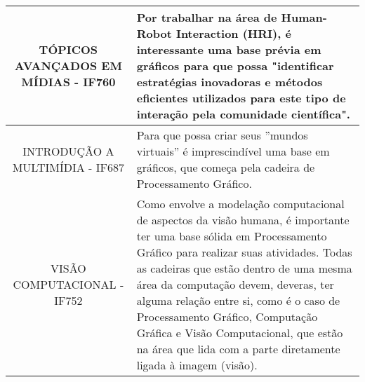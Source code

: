 \documentclass[a4paper]{article}
\begin{document}
\begin{table}[H]
\begin{tabular}{@{}|l p{7cm}|@{}}
\multicolumn{1}{|c|}{TÓPICOS AVANÇADOS EM MÍDIAS - IF760}                                      & Por trabalhar na área de Human-Robot Interaction (HRI), é interessante uma base prévia em gráficos para que possa "identificar estratégias inovadoras e métodos eficientes utilizados para este tipo de interação pela comunidade científica".                                                                                                                 \\ \midrule
\multicolumn{1}{|c|}{INTRODUÇÃO A MULTIMÍDIA - IF687}                                          & Para que possa criar seus ''mundos virtuais'' é imprescindível uma base em gráficos, que começa pela cadeira de Processamento Gráfico.                                                                                                                                                                                                                           \\ \midrule
\multicolumn{1}{|c|}{VISÃO COMPUTACIONAL - IF752}                                              & Como envolve a modelação computacional de aspectos da visão humana, é importante ter uma base sólida em Processamento Gráfico para realizar suas atividades. Todas as cadeiras que estão dentro de uma mesma área da computação devem, deveras, ter alguma relação entre si, como é o caso de Processamento Gráfico, Computação Gráfica e Visão Computacional, que estão na área que lida com a parte diretamente ligada à imagem (visão). \\ \bottomrule 
\end{tabular}
\linebreak
\linebreak
\end{table}



\end{document}
